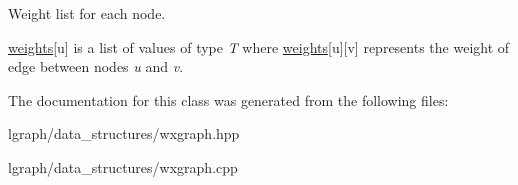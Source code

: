 Weight list for each node. 

\hyperlink{classlgraph_1_1utils_1_1wxgraph_a15569c8c0fccb641709dc81eb0e29c94}{weights}\mbox{[}u\mbox{]} is a list of values of type {\itshape T} where \hyperlink{classlgraph_1_1utils_1_1wxgraph_a15569c8c0fccb641709dc81eb0e29c94}{weights}\mbox{[}u\mbox{]}\mbox{[}v\mbox{]} represents the weight of edge between nodes {\itshape u} and {\itshape v}. 

The documentation for this class was generated from the following files\+:\begin{DoxyCompactItemize}
\item 
lgraph/data\+\_\+structures/wxgraph.\+hpp\item 
lgraph/data\+\_\+structures/wxgraph.\+cpp\end{DoxyCompactItemize}
